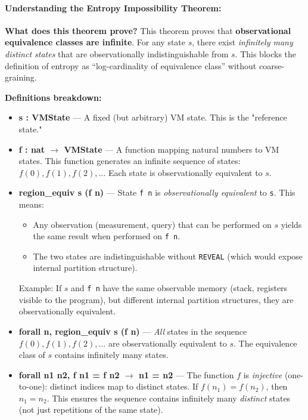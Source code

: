 \paragraph{Understanding the Entropy Impossibility Theorem:}

\textbf{What does this theorem prove?} This theorem proves that \textbf{observational equivalence classes are infinite}. For any state $s$, there exist \textit{infinitely many distinct states} that are observationally indistinguishable from $s$. This blocks the definition of entropy as ``log-cardinality of equivalence class'' without coarse-graining.

\textbf{Definitions breakdown:}
\begin{itemize}
    \item \textbf{s : VMState} — A fixed (but arbitrary) VM state. This is the "reference state."
    
    \item \textbf{f : nat $\to$ VMState} — A function mapping natural numbers to VM states. This function generates an infinite sequence of states: $f(0), f(1), f(2), \ldots$ Each state is observationally equivalent to $s$.
    
    \item \textbf{region\_equiv s (f n)} — State \texttt{f n} is \textit{observationally equivalent} to \texttt{s}. This means:
    \begin{itemize}
        \item Any observation (measurement, query) that can be performed on $s$ yields the same result when performed on \texttt{f n}.
        \item The two states are indistinguishable without \texttt{REVEAL} (which would expose internal partition structure).
    \end{itemize}
    Example: If $s$ and \texttt{f n} have the same observable memory (stack, registers visible to the program), but different internal partition structures, they are observationally equivalent.
    
    \item \textbf{forall n, region\_equiv s (f n)} — \textit{All} states in the sequence $f(0), f(1), f(2), \ldots$ are observationally equivalent to $s$. The equivalence class of $s$ contains infinitely many states.
    
    \item \textbf{forall n1 n2, f n1 = f n2 $\to$ n1 = n2} — The function $f$ is \textit{injective} (one-to-one): distinct indices map to distinct states. If $f(n_1) = f(n_2)$, then $n_1 = n_2$. This ensures the sequence contains infinitely many \textit{distinct} states (not just repetitions of the same state).
\end{itemize}

